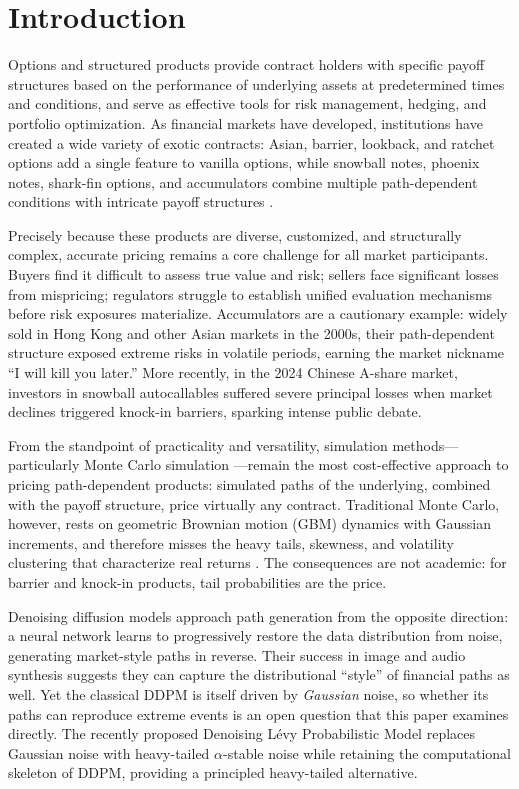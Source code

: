 \documentclass[12pt,letterpaper]{article}
\begin{document}
\doublespacing

\section{Introduction}\label{sec:introduction}

Options and structured products provide contract holders with specific payoff
structures based on the performance of underlying assets at predetermined
times and conditions, and serve as effective tools for risk management,
hedging, and portfolio optimization. As financial markets have developed,
institutions have created a wide variety of exotic contracts: Asian, barrier,
lookback, and ratchet options add a single feature to vanilla options, while
snowball notes, phoenix notes, shark-fin options, and accumulators combine
multiple path-dependent conditions with intricate payoff structures
\citep{pesce2021exotic}.

Precisely because these products are diverse, customized, and structurally
complex, accurate pricing remains a core challenge for all market
participants. Buyers find it difficult to assess true value and risk; sellers
face significant losses from mispricing; regulators struggle to establish
unified evaluation mechanisms before risk exposures materialize. Accumulators
are a cautionary example: widely sold in Hong Kong and other Asian markets in
the 2000s, their path-dependent structure exposed extreme risks in volatile
periods, earning the market nickname ``I will kill you later.'' More
recently, in the 2024 Chinese A-share market, investors in snowball
autocallables suffered severe principal losses when market declines triggered
knock-in barriers, sparking intense public debate.

From the standpoint of practicality and versatility, simulation
methods---particularly Monte Carlo simulation \citep{boyle1977options}---remain
the most cost-effective approach to pricing path-dependent products: simulated
paths of the underlying, combined with the payoff structure, price virtually
any contract. Traditional Monte Carlo, however, rests on geometric Brownian
motion (GBM) dynamics with Gaussian increments, and therefore misses the
heavy tails, skewness, and volatility clustering that characterize real
returns \citep{cont2001empirical}. The consequences are not
academic: for barrier and knock-in products, tail probabilities are the
price.

Denoising diffusion models \citep{ho2020ddpm} approach path generation from
the opposite direction: a neural network learns to progressively restore the
data distribution from noise, generating market-style paths in reverse. Their
success in image and audio synthesis suggests they can capture the
distributional ``style'' of financial paths as well. Yet the classical DDPM
is itself driven by \emph{Gaussian} noise, so whether its paths can
reproduce extreme events is an open question that this paper examines
directly. The recently proposed Denoising L\'evy Probabilistic Model
\citep[DLPM;][]{shariatian2024dlpm} replaces Gaussian noise with heavy-tailed
$\alpha$-stable noise while retaining the computational skeleton of DDPM,
providing a principled heavy-tailed alternative.
\end{document}
